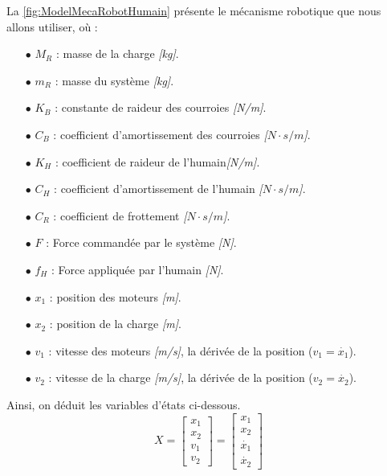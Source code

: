 \documentclass[a4paper,12pt]{article}
\begin{document}
    La \autoref{fig:ModelMecaRobotHumain} présente le mécanisme robotique que nous allons utiliser, où :
    \begin{itemize}
        \item[$\bullet$] $M_R$ : masse de la charge \textit{[kg]}.
        \item[$\bullet$] $m_R$ : masse du système \textit{[kg]}.
        \item[$\bullet$] $K_B$ : constante de raideur des courroies \textit{[N/m]}.
        \item[$\bullet$] $C_B$ : coefficient d'amortissement des courroies \textit{[$N\cdot s/m$]}.
        \item[$\bullet$] $K_H$ : coefficient de raideur de l'humain\textit{[N/m]}.
        \item[$\bullet$] $C_H$ : coefficient d'amortissement de l'humain \textit{[$N\cdot s/m$]}.
        \item[$\bullet$] $C_R$ : coefficient de frottement \textit{[$N\cdot s/m$]}.
        \item[$\bullet$] $F$ : Force commandée par le système \textit{[N]}.
        \item[$\bullet$] $f_H$ : Force appliquée par l'humain \textit{[N]}.
        \item[$\bullet$] $x_1$ : position des moteurs \textit{[m]}.
        \item[$\bullet$] $x_2$ : position de la charge \textit{[m]}.
        \item[$\bullet$] $v_1$ : vitesse des moteurs \textit{[m/s]}, la dérivée de la position ($v_1 = \dot{x_1}$).
        \item[$\bullet$] $v_2$ : vitesse de la charge \textit{[m/s]}, la dérivée de la position ($v_2 = \dot{x_2}$).
    \end{itemize}
    
    Ainsi, on déduit les variables d'états ci-dessous.
    \[
        X =
        \begin{bmatrix}
            x_1 \\
            x_2 \\
            v_1 \\
            v_2
        \end{bmatrix}
        =
        \begin{bmatrix}
            x_1 \\
            x_2 \\
            \dot{x_1} \\
            \dot{x_2}
        \end{bmatrix}
    \]
    
\end{document}
